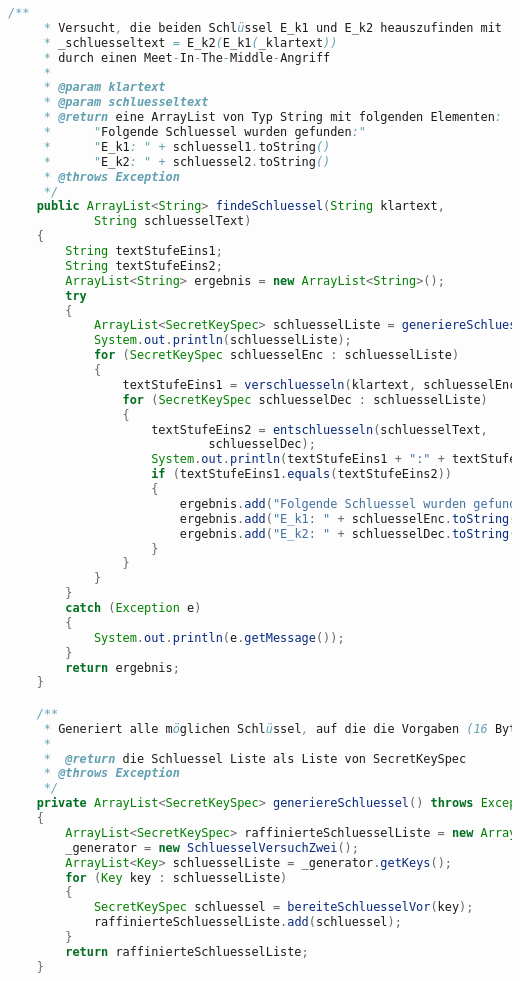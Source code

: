 \documentclass[twoside]{article}
\begin{document}
\begin{lstlisting}[language=Java]
    /**
     * Versucht, die beiden Schlüssel E_k1 und E_k2 heauszufinden mit
     * _schluesseltext = E_k2(E_k1(_klartext))
     * durch einen Meet-In-The-Middle-Angriff
     * 
     * @param klartext
     * @param schluesseltext
     * @return eine ArrayList von Typ String mit folgenden Elementen:
     * 		"Folgende Schluessel wurden gefunden:"
     * 		"E_k1: " + schluessel1.toString()
     * 		"E_k2: " + schluessel2.toString()
     * @throws Exception 
     */
    public ArrayList<String> findeSchluessel(String klartext,
            String schluesselText)
    {
        String textStufeEins1;
        String textStufeEins2;
        ArrayList<String> ergebnis = new ArrayList<String>();
        try
        {
            ArrayList<SecretKeySpec> schluesselListe = generiereSchluessel();
            System.out.println(schluesselListe);
            for (SecretKeySpec schluesselEnc : schluesselListe)
            {
                textStufeEins1 = verschluesseln(klartext, schluesselEnc);
                for (SecretKeySpec schluesselDec : schluesselListe)
                {
                    textStufeEins2 = entschluesseln(schluesselText,
                            schluesselDec);
                    System.out.println(textStufeEins1 + ":" + textStufeEins2);
                    if (textStufeEins1.equals(textStufeEins2))
                    {
                        ergebnis.add("Folgende Schluessel wurden gefunden:");
                        ergebnis.add("E_k1: " + schluesselEnc.toString());
                        ergebnis.add("E_k2: " + schluesselDec.toString());
                    }
                }
            }
        }
        catch (Exception e)
        {
            System.out.println(e.getMessage());
        }
        return ergebnis;
    }

    /**
     * Generiert alle möglichen Schlüssel, auf die die Vorgaben (16 Byte, maximal an 2 Stellen keine 0-Bytes) zutreffen
     * 
     *  @return die Schluessel Liste als Liste von SecretKeySpec
     * @throws Exception 
     */
    private ArrayList<SecretKeySpec> generiereSchluessel() throws Exception
    {
        ArrayList<SecretKeySpec> raffinierteSchluesselListe = new ArrayList<SecretKeySpec>();
        _generator = new SchluesselVersuchZwei();
        ArrayList<Key> schluesselListe = _generator.getKeys();
        for (Key key : schluesselListe)
        {
            SecretKeySpec schluessel = bereiteSchluesselVor(key);
            raffinierteSchluesselListe.add(schluessel);
        }
        return raffinierteSchluesselListe;
    }


\end{lstlisting}
\end{document}
